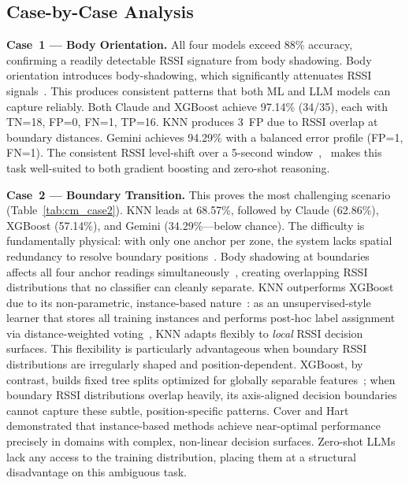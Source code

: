 \documentclass[conference]{IEEEtran}
\begin{document}
\subsection{Case-by-Case Analysis}

\textbf{Case~1 --- Body Orientation.}
All four models exceed 88\% accuracy, confirming a readily detectable RSSI signature from body shadowing. Body orientation introduces body-shadowing, which significantly attenuates RSSI signals~\cite{b6}. This produces consistent patterns that both ML and LLM models can capture reliably. Both Claude and XGBoost achieve 97.14\% (34/35), each with TN=18, FP=0, FN=1, TP=16. KNN produces 3~FP due to RSSI overlap at boundary distances. Gemini achieves 94.29\% with a balanced error profile (FP=1, FN=1). The consistent RSSI level-shift over a 5-second window~\cite{b6},~\cite{b14} makes this task well-suited to both gradient boosting and zero-shot reasoning.

\textbf{Case~2 --- Boundary Transition.}
This proves the most challenging scenario (Table~\ref{tab:cm_case2}). KNN leads at 68.57\%, followed by Claude (62.86\%), XGBoost (57.14\%), and Gemini (34.29\%---below chance). The difficulty is fundamentally physical: with only one anchor per zone, the system lacks spatial redundancy to resolve boundary positions~\cite{b14}. Body shadowing at boundaries affects all four anchor readings simultaneously~\cite{b6}, creating overlapping RSSI distributions that no classifier can cleanly separate. KNN outperforms XGBoost due to its non-parametric, instance-based nature~\cite{b15}: as an unsupervised-style learner that stores all training instances and performs post-hoc label assignment via distance-weighted voting~\cite{b3}, KNN adapts flexibly to \textit{local} RSSI decision surfaces. This flexibility is particularly advantageous when boundary RSSI distributions are irregularly shaped and position-dependent. XGBoost, by contrast, builds fixed tree splits optimized for globally separable features~\cite{b16}; when boundary RSSI distributions overlap heavily, its axis-aligned decision boundaries cannot capture these subtle, position-specific patterns. Cover and Hart~\cite{b15} demonstrated that instance-based methods achieve near-optimal performance precisely in domains with complex, non-linear decision surfaces. Zero-shot LLMs lack any access to the training distribution, placing them at a structural disadvantage on this ambiguous task.
\end{document}
